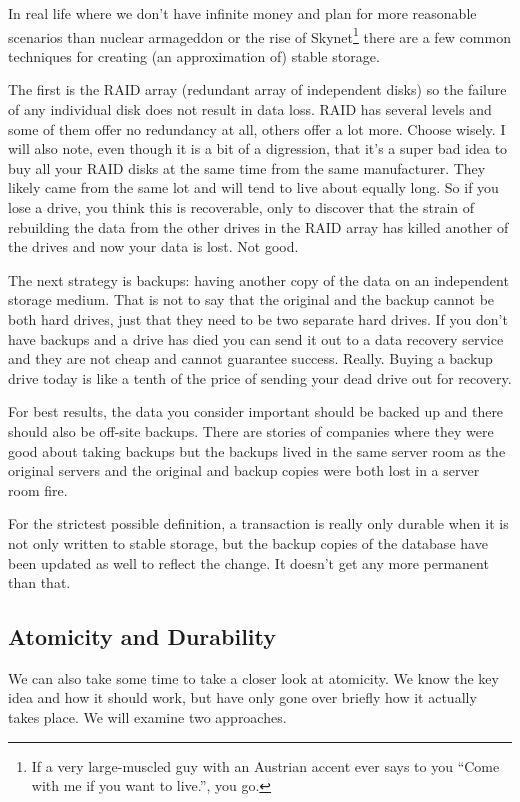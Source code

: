 \documentclass[a4paper]{report}
\begin{document}
In real life where we don't have infinite money and plan for more reasonable scenarios than nuclear armageddon or the rise of Skynet\footnote{If a very large-muscled guy with an Austrian accent ever says to you ``Come with me if you want to live.'', you go.} there are a few common techniques for creating (an approximation of) stable storage. 

The first is the RAID array (redundant array of independent disks) so the failure of any individual disk does not result in data loss. RAID has several levels and some of them offer no redundancy at all, others offer a lot more. Choose wisely. I will also note, even though it is a bit of a digression, that it's a super bad idea to buy all your RAID disks at the same time from the same manufacturer. They likely came from the same lot and will tend to live about equally long. So if you lose a drive, you think this is recoverable, only to discover that the strain of rebuilding the data from the other drives in the RAID array has killed another of the drives and now your data is lost. Not good.

The next strategy is backups: having another copy of the data on an independent storage medium. That is not to say that the original and the backup cannot be both hard drives, just that they need to be two separate hard drives. If you don't have backups and a drive has died you can send it out to a data recovery service and they are not cheap and cannot guarantee success. Really. Buying a backup drive today is like a tenth of the price of sending your dead drive out for recovery. 

For best results, the data you consider important should be backed up and there should also be off-site backups. There are stories of companies where they were good about taking backups but the backups lived in the same server room as the original servers and the original and backup copies were both lost in a server room fire.

For the strictest possible definition, a transaction is really only durable when it is not only written to stable storage, but the backup copies of the database have been updated as well to reflect the change. It doesn't get any more permanent than that. 

\subsection*{Atomicity and Durability}

We can also take some time to take a closer look at atomicity. We know the key idea and how it should work, but have only gone over briefly how it actually takes place. We will examine two approaches.
\end{document}
